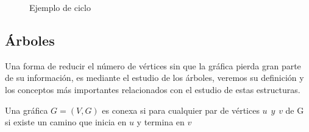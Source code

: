  \begin{example}
    \begin{figure}[h]
    \centering
    
    \begin{minipage}{0.45\textwidth}
        \centering
        \caption{Ejemplo de camino}
        \label{fig:camino}
    \end{minipage}
    \hfill

    \begin{minipage}{0.45\textwidth}
        \centering
        \caption{Ejemplo de ciclo}
        \label{fig:ciclo}
    \end{minipage}
\end{figure}


 \end{example}


 \subsection{Árboles}
 Una forma de reducir el número de vértices sin que la gráfica pierda gran parte de su información, es mediante el estudio de los árboles, veremos su definición y los conceptos más importantes relacionados con el estudio de estas estructuras.

  \begin{definition}
     Una gráfica $G=(V,G)$ es conexa si para cualquier par de vértices $u \hspace{5pt} y \hspace{5pt} v$ de G si existe un camino que inicia en $u$ y termina en $v$ 
\end{definition}

